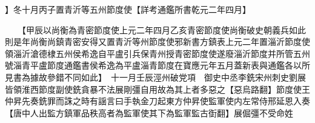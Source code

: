】冬十月丙子置青沂等五州節度使【詳考通鑑所書乾元二年四月】

　　【甲辰以尚衡為青密節度使上元二年四月乙亥青密節度使尚衡破史朝義兵如此則是年尚衡尚鎮青密安得又置青沂等州節度使邪新書方鎮表上元二年置淄沂節度使領淄沂滄德棣五州侯希逸自平盧引兵保青州授青密節度使遂廢淄沂節度并所管五州號淄青平盧節度通鑑書侯希逸為平盧淄青節度在寶應元年五月蓋新表與通鑑各以所見書為據故參錯不同如此】　十一月壬辰涇州破党項　御史中丞李銑宋州刺史劉展皆領淮西節度副使銑貪暴不法展剛彊自用故為其上者多惡之【惡烏路翻】節度使王仲昇先奏銑罪而誅之時有謡言曰手執金刀起東方仲昇使監軍使内左常侍邢延恩入奏【唐中人出監方鎮軍品秩高者為監軍使其下為監軍監古衘翻】展倔彊不受命姓